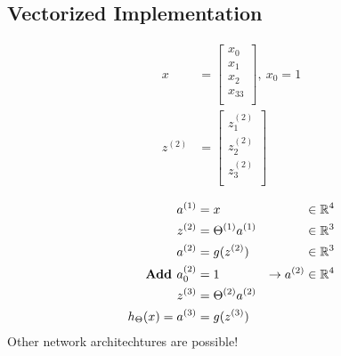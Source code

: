 \subsection*{Vectorized Implementation}
\begin{align*}
	x       & = \begin{bmatrix}
		x_0  \\
		x_1  \\
		x_2  \\
		x_33 \\
	\end{bmatrix},\ x_0 = 1 \\
	z^{(2)} & = \begin{bmatrix}
		z_1^{(2)} \\
		z_2^{(2)} \\
		z_3^{(2)} \\
	\end{bmatrix}           \\
\end{align*}
\begin{align*}
	a^{(1)}                        & = x
	                               & \in \mathbb{R}^4                     \\
	z^{(2)}                        & = \Theta^{(1)}a^{(1)}
	                               & \in \mathbb{R}^3                     \\
	a^{(2)}                        & = g(z^{(2)})
	                               & \in \mathbb{R}^3                     \\
	\text{\textbf{Add }} a_0^{(2)} & = 1
	                               & \rightarrow a^{(2)} \in \mathbb{R}^4 \\
	z^{(3)}                        & = \Theta^{(2)}a^{(2)}        \\
	h_\Theta(x) = a^{(3)}          & = g(z^{(3)})                 \\
\end{align*}
Other network architechtures are possible!